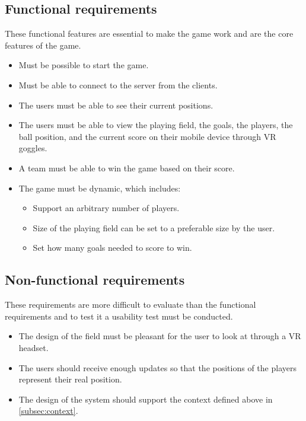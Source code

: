 \subsection{Functional requirements}
These functional features are essential to make the game work and are the core features of the game.

\begin{itemize}
    \item Must be possible to start the game.
    \item Must be able to connect to the server from the clients.
    \item The users must be able to see their current positions.
    \item The users must be able to view the playing field, the goals, the players, the ball position, and the current score on their mobile device through VR goggles.
    \item A team must be able to win the game based on their score.
    \item The game must be dynamic, which includes:
          \begin{itemize}
              \item Support an arbitrary number of players.
              \item Size of the playing field can be set to a preferable size by the user.
              \item Set how many goals needed to score to win.
          \end{itemize}
\end{itemize}

\subsection{Non-functional requirements}
These requirements are more difficult to evaluate than the functional requirements and to test it a usability test must be conducted.
\begin{itemize}
    \item The design of the field must be pleasant for the user to look at through a VR headset.
    \item The users should receive enough updates so that the positions of the players represent their real position.
    \item The design of the system should support the context defined above in \autoref{subsec:context}.
\end{itemize}
